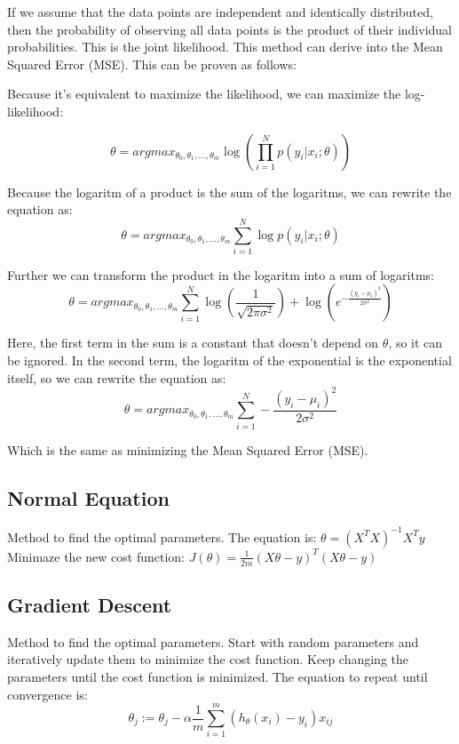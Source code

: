 \documentclass{article}
\begin{document}
If we assume that the data points are independent and identically distributed, 
then the probability of observing all data points is the product of their 
individual probabilities. This is the joint likelihood. This method can derive into the Mean Squared Error (MSE). This can be proven
as follows:

Because it's equivalent to maximize the likelihood, we can maximize the log-likelihood:

$$
\theta = argmax_{\theta_0, \theta_1, \ldots, \theta_m} \log \left( \prod_{i=1}^{N} p(y_i | x_i; \theta) \right)
$$

Because the logaritm of a product is the sum of the logaritms, we can rewrite the equation as:
$$
\theta = argmax_{\theta_0, \theta_1, \ldots, \theta_m} \sum_{i=1}^{N} \log p(y_i | x_i; \theta)
$$

Further we can transform the product in the logaritm into a sum of logaritms:
$$
\theta = argmax_{\theta_0, \theta_1, \ldots, \theta_m} \sum_{i=1}^{N} \log \left( \frac{1}{\sqrt{2\pi \sigma^2}} \right) + \log \left( e^{-\frac{(y_i - \mu_i)^2}{2\sigma^2}} \right)
$$

Here, the first term in the sum is a constant that doesn't depend on $\theta$, so it can be ignored.
In the second term, the logaritm of the exponential is the exponential itself, so we can rewrite the equation as:
$$
\theta = argmax_{\theta_0, \theta_1, \ldots, \theta_m} \sum_{i=1}^{N} -\frac{(y_i - \mu_i)^2}{2\sigma^2}
$$

Which is the same as minimizing the Mean Squared Error (MSE).

\subsection{Normal Equation}

Method to find the optimal parameters.
The equation is: $\theta = (X^T X)^{-1} X^T y$
Minimaze the new cost function: $J(\theta) = \frac{1}{2m} (X \theta - y)^T (X \theta - y)$

\subsection{Gradient Descent}

Method to find the optimal parameters. 
Start with random parameters and iteratively update them to minimize the cost function.
Keep changing the parameters until the cost function is minimized.
The equation to repeat until convergence is: 
$$
\theta_j := \theta_j - \alpha \frac{1}{m} \sum_{i=1}^{m} (h_\theta(x_i) - y_i) x_{ij}
$$
\end{document}
